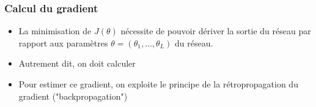 \documentclass[9pt,table]{beamer} %
\begin{document}
\begin{frame}
\frametitle{Calcul du gradient}

\begin{itemize}[label=\tiny$\blacksquare$]
	\item La minimisation de $J(\theta)$ nécessite de pouvoir dériver la sortie du réseau par rapport aux paramètres $\theta = (\theta_1,\ldots,\theta_L)$ du réseau.
	
	\item Autrement dit, on doit calculer
	
	
	\item Pour estimer ce gradient, on exploite le principe de la \alert{rétropropagation du gradient} ("backpropagation")
\end{itemize}
\end{frame}
\end{document}
